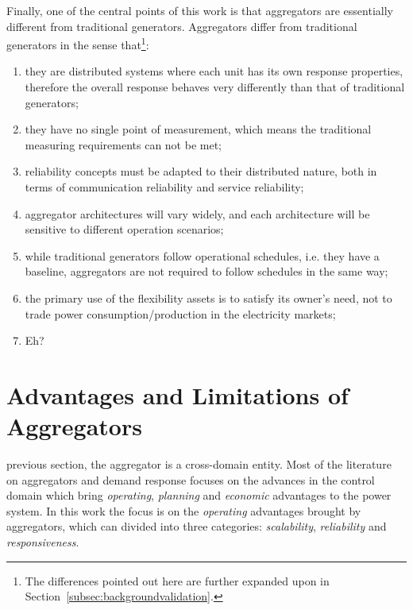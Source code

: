 Finally, one of the central points of this work is that aggregators are essentially different from traditional generators. Aggregators differ from traditional generators in the sense that\footnote{The differences pointed out here are further expanded upon in Section~\ref{subsec:backgroundvalidation}.}:
\begin{enumerate}
	\item they are distributed systems where each unit has its own response properties, therefore the overall response behaves very differently than that of traditional generators;\label{point:aggblackbox}
	\item they have no single point of measurement, which means the traditional measuring requirements can not be met;
	\item reliability concepts must be adapted to their distributed nature, both in terms of communication reliability and service reliability;
	\item aggregator architectures will vary widely, and each architecture will be sensitive to different operation scenarios;
	\item while traditional generators follow operational schedules, i.e. they have a baseline, aggregators are not required to follow schedules in the same way;
	\item the primary use of the flexibility assets is to satisfy its owner's need, not to trade power consumption/production in the electricity markets;
	\item Eh? 
\end{enumerate}

\section{Advantages and Limitations of Aggregators}
 previous section, the aggregator is a cross-domain entity. Most of the literature on aggregators and demand response focuses on the advances in the control domain which bring \emph{operating}, \emph{planning} and \emph{economic} advantages to the power system. In this work the focus is on the \emph{operating} advantages brought by aggregators, which can divided into three categories: \emph{scalability}, \emph{reliability} and \emph{responsiveness}.

